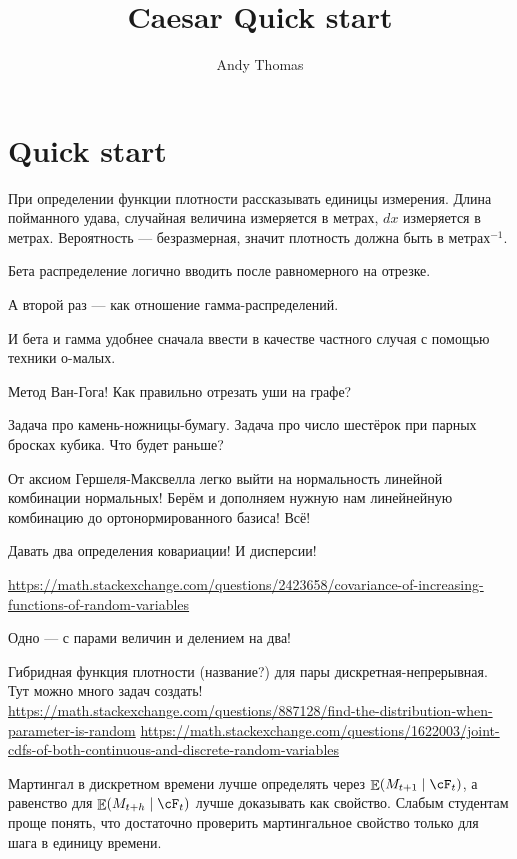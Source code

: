 \documentclass{article}
\title{Caesar Quick start}
\author{Andy Thomas}
\DeclareMathOperator{\E}{\mathbb{E}}
\begin{document}
\tableofcontents
\section{Quick start}
%


При определении функции плотности рассказывать единицы измерения. 
Длина пойманного удава, случайная величина измеряется в метрах, $dx$ измеряется в метрах. 
Вероятность — безразмерная, значит плотность должна быть в метрах$^{-1}$.

Бета распределение логично вводить после равномерного на отрезке. 

А второй раз — как отношение гамма-распределений. 

И бета и гамма удобнее сначала ввести в качестве частного случая с помощью техники о-малых. 


Метод Ван-Гога! Как правильно отрезать уши на графе?

Задача про камень-ножницы-бумагу. Задача про число шестёрок при парных бросках кубика.
Что будет раньше?

От аксиом Гершеля-Максвелла легко выйти на нормальность линейной комбинации нормальных!
Берём и дополняем нужную нам линейнейную комбинацию до ортонормированного базиса! Всё!


Давать два определения ковариации! И дисперсии!

\url{https://math.stackexchange.com/questions/2423658/covariance-of-increasing-functions-of-random-variables}

Одно — с парами величин и делением на два!


Гибридная функция плотности (название?) для пары дискретная-непрерывная. Тут можно много задач создать!
\url{https://math.stackexchange.com/questions/887128/find-the-distribution-when-parameter-is-random}
\url{https://math.stackexchange.com/questions/1622003/joint-cdfs-of-both-continuous-and-discrete-random-variables}



Мартингал в дискретном времени лучше определять через $\E(M_{t+1} \mid \cF_t)$, а равенство для $\E(M_{t+h} \mid \cF_t)$ лучше доказывать как свойство. 
Слабым студентам проще понять, что достаточно проверить мартингальное свойство только для шага в единицу времени. 
\end{document}
